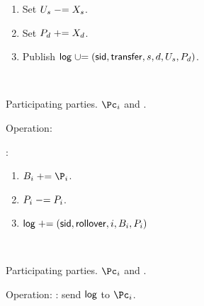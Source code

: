 \begin{protocol}
\begin{enumerate}
\begin{enumerate}
		
		     \item  Set $U_s \mathrel{-}= X_s$. 
              
              \item  Set $P_d \mathrel{+}= X_d$. 
              
              		     
		     \item Publish  $\mathsf{log} \mathrel{\cup}= (\mathsf{sid},\mathsf{transfer},s,d,U_s,P_d)$.
		     
		\end{enumerate}
		
	\end{enumerate}
	
\end{protocol}




\begin{protocol}~\label{prot:ConfidentialTransactions:Rollover}
	\item[Participating parties.] $\Pc_i$ and \Cc.
	
\item[Operation:] ~
	
	\Cc:
	
	\begin{enumerate}
	
	\item $B_i  \pluseq \P_i$.
	
	
	\item  $P_i \mathrel{-}= P_i$.
	
	\item  $\mathsf{log} \mathrel{+}= (\mathsf{sid},\mathsf{rollover},i,B_i,P_i)$
	
	
\end{enumerate}
	
\end{protocol}

\begin{protocol}~\label{prot:ConfidentialTransactions:History}
	\item[Participating parties.] $\Pc_i$ and \Cc.
		
	\item Operation: \Cc: send  $\mathsf{log}$ to $\Pc_i$.
	
\end{protocol}
